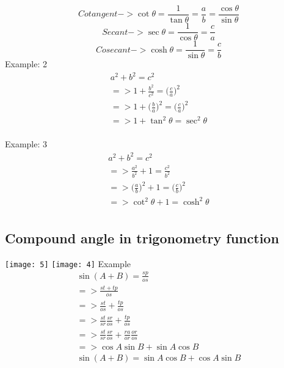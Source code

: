 \begin{equation}
	Cotangent->\cot\theta = \frac{1}{\tan\theta} = \frac{a}{b} = \frac{\cos\theta}{\sin\theta}
\end{equation}
\begin{equation}
	Secant->\sec\theta = \frac{1}{\cos\theta} = \frac{c}{a}
\end{equation}
\begin{equation}
	Cosecant->\cosh\theta = \frac{1}{\sin\theta}=\frac{c}{b}
\end{equation}
\newline
Example: 2
\begin{align}
	a^2+b^2=c^2 \\
	=>1+\frac{b^2}{c^2}=\bigg(\frac{c}{a}\bigg)^2 \\
	=> 1+\bigg(\frac{b}{a}\bigg)^2=\bigg(\frac{c}{a}\bigg)^2 \\
	=> 1+\tan^2\theta = \sec^2\theta \\	
\end{align}

Example: 3
\begin{align}
	a^2+b^2=c^2 \\
	=>\frac{a^2}{b^2}+1 = \frac{c^2}{b^2} \\
	=> \bigg(\frac{a}{b}\bigg)^2+1= \bigg(\frac{c}{b}\bigg)^2 \\
	=> \cot^2\theta+1=\cosh^2\theta \\
\end{align}





\subsection{Compound angle in trigonometry function}
	\texttt{[image: 5]}
	\texttt{[image: 4]}
	\newline
	Example
	\begin{align}
		\sin(A+B)=\frac{sp}{os} \\
		=>\frac{st+tp}{os} \\
		=>\frac{st}{os}+\frac{tp}{os} \\
		=>\frac{st}{sr}\frac{sr}{os}+\frac{tp}{os} \\
		=>\frac{st}{sr}\frac{sr}{os}+\frac{ra}{or}\frac{or}{os} \\
		=> \cos A\sin B+\sin A\cos B \\
		\sin(A+B) = \sin A\cos B+\cos A\sin B \\
	\end{align}


